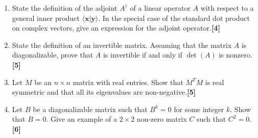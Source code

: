\documentclass[a4paper]{article}
\begin{document}
\begin{qns}\leavevmode
\begin{enumerate}[label=(\alph*)]
\item State the definition of the adjoint $A^\dag$ of a linear operator $A$ with respect to a general inner product $\langle\mathbf{x}|\mathbf{y}\rangle$. In the special case of the standard dot product on complex vectors, give an expression for the adjoint operator.\hfill\textbf{[4]}
\item State the definition of an invertible matrix. Assuming that the matrix $A$ is diagonalizable, prove that $A$ is invertible if and only if $\det(A)$ is nonzero.\hfill\textbf{[5]}
\item Let $M$ be an $n\times n$ matrix with real entries. Show that $M^TM$ is real symmetric and that all its eigenvalues are non-negative.\hfill\textbf{[5]}
\item Let $B$ be a diagonalizable matrix such that $B^k = 0$ for some integer $k$. Show that $B = 0$. Give an example of a $2\times 2$ non-zero matrix $C$ such that $C^2 = 0$. \hfill\textbf{[6]}
\end{enumerate}
\end{qns}
\end{document}
